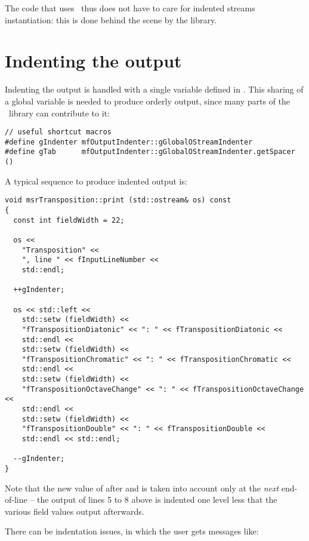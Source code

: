 The code that uses \mf\ thus does not have to care for indented streams instantiation: this is done behind the scene by the library.


\section{Indenting the output}

Indenting the output is handled with a single variable defined in .
This sharing of a global variable is needed to produce orderly output, since many parts of the \mf\ library can contribute to it:
\begin{lstlisting}[language=CPlusPlus]
// useful shortcut macros
#define gIndenter mfOutputIndenter::gGlobalOStreamIndenter
#define gTab      mfOutputIndenter::gGlobalOStreamIndenter.getSpacer ()
\end{lstlisting}

A typical sequence to produce indented output is:
\begin{lstlisting}[language=CPlusPlus]
void msrTransposition::print (std::ostream& os) const
{
  const int fieldWidth = 22;

  os <<
    "Transposition" <<
    ", line " << fInputLineNumber <<
    std::endl;

  ++gIndenter;

  os << std::left <<
    std::setw (fieldWidth) <<
    "fTranspositionDiatonic" << ": " << fTranspositionDiatonic <<
    std::endl <<
    std::setw (fieldWidth) <<
    "fTranspositionChromatic" << ": " << fTranspositionChromatic <<
    std::endl <<
    std::setw (fieldWidth) <<
    "fTranspositionOctaveChange" << ": " << fTranspositionOctaveChange <<
    std::endl <<
    std::setw (fieldWidth) <<
    "fTranspositionDouble" << ": " << fTranspositionDouble <<
    std::endl << std::endl;

  --gIndenter;
}
\end{lstlisting}

Note that the new value of  after  and  is taken into account only at the {\it next} end-of-line -- the output of lines 5 to 8 above is indented one level less that the various field values output afterwards.

There can be indentation issues, in which the user gets messages like:
\begin{lstlisting}[language=Terminal]
% ### Indentation has become negative: -1
\end{lstlisting}

